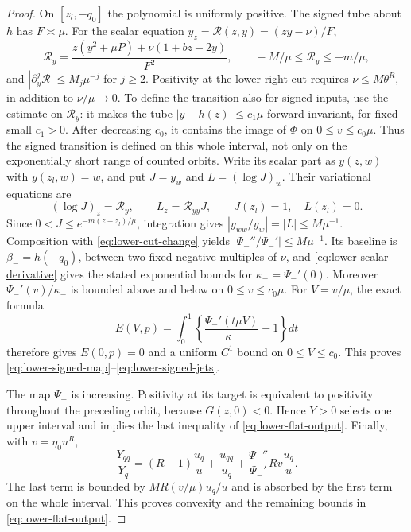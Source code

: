 \begin{proof}
On $[z_l,-q_0]$ the polynomial is uniformly positive. The signed tube
about $h$ has $F\asymp\mu$. For the scalar equation
$y_z=\mathcal R(z,y)=(zy-\nu)/F$,
\begin{equation}\label{eq:lower-scalar-derivative}
 \mathcal R_y=
 \frac{z(y^2+\mu P)+\nu(1+bz-2y)}{F^2},\qquad
 -M/\mu\le\mathcal R_y\le-m/\mu,
\end{equation}
and $|\partial_y^j\mathcal R|\le M_j\mu^{-j}$ for $j\ge2$.
Positivity at the lower right cut requires $\nu\le M\theta^R$, in
addition to $\nu/\mu\to0$. To define the transition also for signed
inputs, use the estimate on $\mathcal R_y$: it makes the tube
$|y-h(z)|\le c_1\mu$ forward invariant, for fixed small $c_1>0$.
After decreasing $c_0$, it contains the image of $\Phi$ on
$0\le v\le c_0\mu$. Thus the signed transition is defined on this whole
interval, not only on the exponentially short range of counted orbits.
Write its scalar part as $y(z,w)$ with $y(z_l,w)=w$, and put
$J=y_w$ and $L=(\log J)_w$. Their variational equations are
\begin{equation}\label{eq:lower-relative-variations}
 (\log J)_z=\mathcal R_y,\qquad L_z=\mathcal R_{yy}J,
 \qquad J(z_l)=1,\quad L(z_l)=0.
\end{equation}
Since $0<J\le e^{-m(z-z_l)/\mu}$, integration gives
$|y_{ww}/y_w|=|L|\le M\mu^{-1}$.
Composition with \eqref{eq:lower-cut-change} yields
$|\Psi_-''/\Psi_-'|\le M\mu^{-1}$.
Its baseline is $\beta_-=h(-q_0)$, between two fixed negative multiples
of $\nu$, and \eqref{eq:lower-scalar-derivative} gives the stated
exponential bounds for $\kappa_-=\Psi_-'(0)$. Moreover
$\Psi_-'(v)/\kappa_-$ is bounded above and below on $0\le v\le c_0\mu$.
For $V=v/\mu$, the exact formula
\[
 E(V,p)=\int_0^1
       \left\{\frac{\Psi_-'(t\mu V)}{\kappa_-}-1\right\}dt
\]
therefore gives $E(0,p)=0$ and a uniform $C^1$ bound on $0\le V\le c_0$.
This proves
\eqref{eq:lower-signed-map}--\eqref{eq:lower-signed-jets}.

The map $\Psi_-$ is increasing. Positivity at its target is equivalent
to positivity throughout the preceding orbit, because $G(z,0)<0$.
Hence $Y>0$ selects one upper interval and implies the last inequality
of \eqref{eq:lower-flat-output}. Finally, with $v=\eta_0u^R$,
\[
 \frac{Y_{qq}}{Y_q}
  =(R-1)\frac{u_q}{u}+\frac{u_{qq}}{u_q}
           +\frac{\Psi_-''}{\Psi_-'}R v\frac{u_q}{u}.
\]
The last term is bounded by $M R(v/\mu)u_q/u$ and is absorbed by the
first term on the whole interval. This proves convexity and the remaining
bounds in \eqref{eq:lower-flat-output}.
\end{proof}

